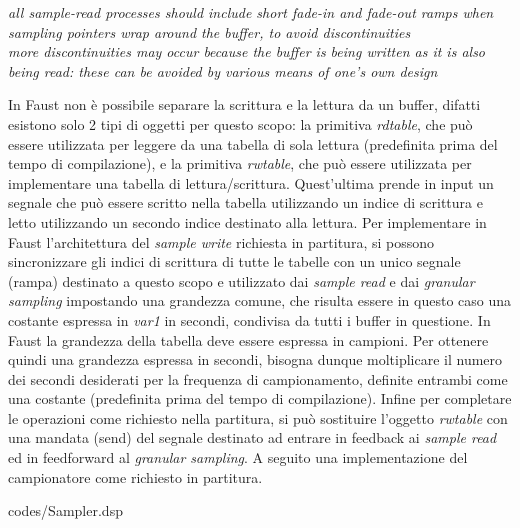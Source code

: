 \begin{center}
    \vspace{0.5cm}
    \textit{all sample-read processes 
    should include short fade-in and fade-out
    ramps when sampling pointers wrap around the buffer, to avoid
    discontinuities \\
    more discontinuities may occur because the buffer is being written
    as it is also being read: these can be avoided by various means of
    one's own design}
    \vspace{0.5cm}
\end{center}

In Faust non è possibile separare la scrittura e la lettura da un buffer,
difatti esistono solo 2 tipi di oggetti per questo scopo:
la primitiva \textit{rdtable}, che può essere utilizzata per leggere da una tabella di sola lettura 
(predefinita prima del tempo di compilazione),
e la primitiva \textit{rwtable}, che può essere utilizzata per implementare una tabella di lettura/scrittura. 
Quest'ultima prende in input un segnale che può essere scritto nella tabella utilizzando un indice di scrittura e 
letto utilizzando un secondo indice destinato alla lettura.
Per implementare in Faust l'architettura del \textit{sample write} richiesta in partitura, 
si possono sincronizzare gli indici di scrittura di tutte le tabelle con un unico 
segnale (rampa) destinato a questo scopo e utilizzato dai \textit{sample read} e dai \textit{granular sampling} 
impostando una grandezza comune, che risulta essere in questo caso una costante espressa in \textit{var1} in secondi, 
condivisa da tutti i buffer in questione.
In Faust la grandezza della tabella deve essere espressa in campioni. Per ottenere quindi
una grandezza espressa in secondi, bisogna dunque moltiplicare il numero dei secondi desiderati per
la frequenza di campionamento, definite entrambi come una costante (predefinita prima del tempo di compilazione).
Infine per completare le operazioni come richiesto nella partitura, si può sostituire l'oggetto \textit{rwtable}
con una mandata (send) del segnale destinato ad entrare in feedback ai \textit{sample read} ed in
feedforward al \textit{granular sampling}.
A seguito una implementazione del campionatore come richiesto in partitura.

\vspace{0.5cm} 

{codes/Sampler.dsp}

